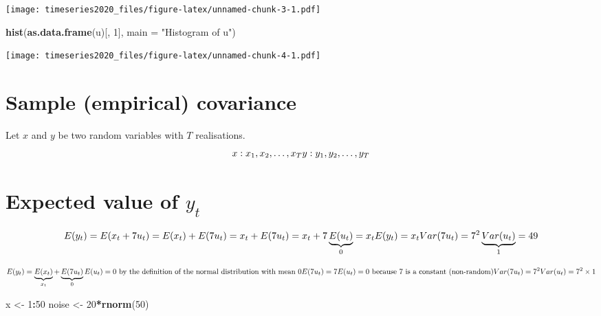 \documentclass[
]{book}
\newenvironment{Shaded}{\begin{snugshade}}{\end{snugshade}}
\newcommand{\DataTypeTok}[1]{\textcolor[rgb]{0.13,0.29,0.53}{#1}}
\newcommand{\DecValTok}[1]{\textcolor[rgb]{0.00,0.00,0.81}{#1}}
\newcommand{\KeywordTok}[1]{\textcolor[rgb]{0.13,0.29,0.53}{\textbf{#1}}}
\newcommand{\NormalTok}[1]{#1}
\newcommand{\OperatorTok}[1]{\textcolor[rgb]{0.81,0.36,0.00}{\textbf{#1}}}
\newcommand{\StringTok}[1]{\textcolor[rgb]{0.31,0.60,0.02}{#1}}
\begin{document}
\texttt{[image: timeseries2020\_files/figure-latex/unnamed-chunk-3-1.pdf]}

\begin{Shaded}
\begin{Highlighting}[]
\KeywordTok{hist}\NormalTok{(}\KeywordTok{as.data.frame}\NormalTok{(u)[, }\DecValTok{1}\NormalTok{], }\DataTypeTok{main =} \StringTok{"Histogram of u"}\NormalTok{)}
\end{Highlighting}
\end{Shaded}

\texttt{[image: timeseries2020\_files/figure-latex/unnamed-chunk-4-1.pdf]}

\hypertarget{sample-empirical-covariance}{%
\section{Sample (empirical) covariance}\label{sample-empirical-covariance}}

Let \(x\) and \(y\) be two random variables with \(T\) realisations.
\[
x: x_{1}, x_{2}, \ldots, x_{T}\\
y: y_{1}, y_{2}, \ldots, y_{T}\\
\]

\hypertarget{expected-value-of-y_t}{%
\section{\texorpdfstring{Expected value of \(y_t\)}{Expected value of y\_t}}\label{expected-value-of-y_t}}

\[
E(y_t) = E(x_t + 7u_t) = E(x_t) + E(7u_t) = x_{t} + E(7u_t) = x_{t} + 7\underbrace{E(u_t)}_{0} = x_t \\
E(y_t) = x_t \\
Var(7u_t) = 7^2 \underbrace{Var(u_t)}_{1} = 49
\]

\[
E(y_t) = \underbrace{E(x_t)}_{x_t} + \underbrace{E(7u_t)}_{0} \\
E(u_t) = 0 \text{ by the definition of the normal distribution with mean 0} \\
E(7u_t) = 7E(u_t) = 0 \text{ because 7 is a constant (non-random)}\\
Var(7u_t) = 7^2Var(u_t) = 7^2\times 1
\]

\begin{Shaded}
\begin{Highlighting}[]
\NormalTok{x <-}\StringTok{ }\DecValTok{1}\OperatorTok{:}\DecValTok{50}
\NormalTok{noise <-}\StringTok{ }\DecValTok{20}\OperatorTok{*}\KeywordTok{rnorm}\NormalTok{(}\DecValTok{50}\NormalTok{)}
\end{Highlighting}
\end{Shaded}
\end{document}
